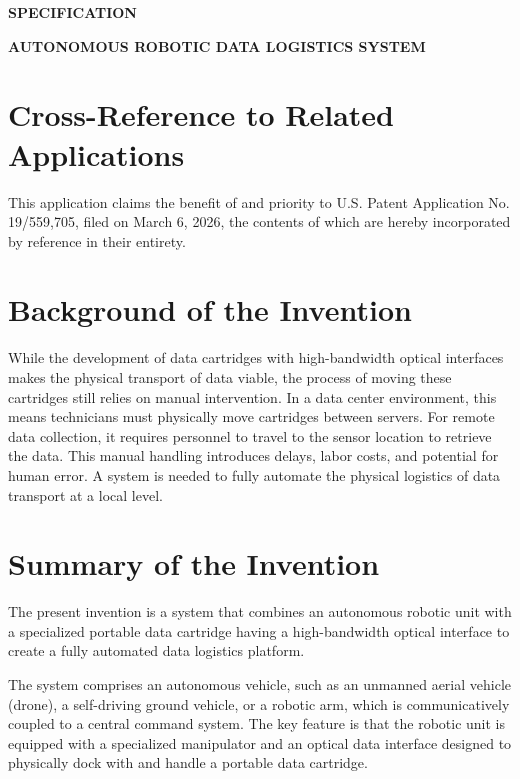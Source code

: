 \documentclass[11pt,letterpaper]{article}
\begin{document}
\thispagestyle{empty}

\begin{center}
    \textbf{\large SPECIFICATION}
\end{center}

\vspace{0.4cm}

\begin{center}
    \textbf{\large AUTONOMOUS ROBOTIC DATA LOGISTICS SYSTEM}
\end{center}

\vspace{0.4cm}

\section*{Cross-Reference to Related Applications}

This application claims the benefit of and priority to U.S. Patent Application No. 19/559,705, filed on March 6, 2026, the contents of which are hereby incorporated by reference in their entirety.

\section*{Background of the Invention}

While the development of data cartridges with high-bandwidth optical interfaces makes the physical transport of data viable, the process of moving these cartridges still relies on manual intervention. In a data center environment, this means technicians must physically move cartridges between servers. For remote data collection, it requires personnel to travel to the sensor location to retrieve the data. This manual handling introduces delays, labor costs, and potential for human error. A system is needed to fully automate the physical logistics of data transport at a local level.

\section*{Summary of the Invention}

The present invention is a system that combines an autonomous robotic unit with a specialized portable data cartridge having a high-bandwidth optical interface to create a fully automated data logistics platform.

The system comprises an autonomous vehicle, such as an unmanned aerial vehicle (drone), a self-driving ground vehicle, or a robotic arm, which is communicatively coupled to a central command system. The key feature is that the robotic unit is equipped with a specialized manipulator and an optical data interface designed to physically dock with and handle a portable data cartridge.
\end{document}
